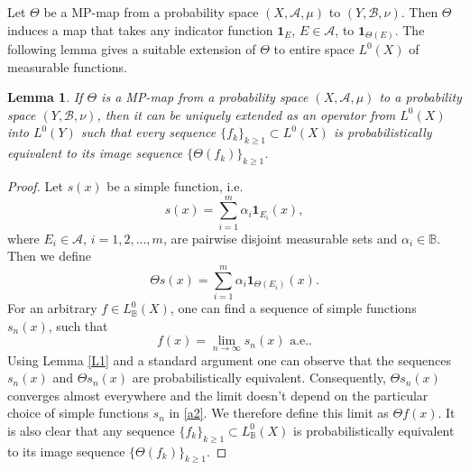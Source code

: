 \documentclass[12pt,reqno,fleqn]{amsart}
\theoremstyle{plain} %
\newtheorem{lemma}{Lemma}[section]
\theoremstyle{remark}
\def\ZB{\ensuremath{\mathscr B}}
\def\zB{\ensuremath{\mathbb B}}
\def\ZA{\ensuremath{\mathscr A}}
\def\ZI{\ensuremath{\mathbf 1}}
\theoremstyle{plain}
\numberwithin{equation}{section}
\newcommand {\e }[1]{\eqref{#1}}
\newcommand {\lem }[1]{Lemma \ref{#1}}
\begin{document}
Let $\Theta$ be a MP-map from a probability space $(X,\ZA,\mu)$ to $(Y,\ZB,\nu)$. Then $\Theta$ induces a map that takes any indicator function $\ZI_E$, $E\in \ZA$, to $\ZI_{\Theta(E)}$. The following lemma gives a suitable extension of $\Theta$ to entire space $L^0(X)$ of measurable functions. 
\begin{lemma}\label{L6}
	If  $\Theta$ is a MP-map  from a probability space $(X,\ZA,\mu)$ to a probability space $(Y,\ZB,\nu)$, then it can be uniquely extended as an operator from $L^0(X)$ into $L^0(Y)$ such that  every sequence $\{f_k\}_{k\ge1}\subset L^0(X)$ is probabilistically equivalent to its image sequence $\{\Theta(f_k)\}_{k\ge 1}$.
\end{lemma}
\begin{proof}
	Let $s(x)$ be a simple function, i.e.
	\begin{equation}
		s(x)=\sum_{i=1}^m\alpha_i\ZI_{E_i}(x),
	\end{equation}
	where $E_i\in \ZA$, $i=1,2,\ldots,m $, are pairwise disjoint measurable sets and $\alpha_i\in \zB$. Then we define 
	\begin{equation}
		\Theta s(x)=\sum_{i=1}^m\alpha_i\ZI_{\Theta(E_i)}(x).
	\end{equation}
	For an arbitrary  $f\in L^0_\zB(X)$, one can find a sequence of simple functions $s_n(x)$, such that 
	\begin{equation}\label{a2}
		f(x)=\lim_{n\to\infty}s_n(x)\text{ a.e..}
	\end{equation}
	Using \lem{L1} and a standard argument one can observe that the sequences $s_n(x)$ and $\Theta s_n(x)$ are probabilistically equivalent. Consequently, $\Theta s_n(x)$ converges almost everywhere and the limit doesn't depend on the particular choice of simple functions $s_n$ in \e{a2}. We therefore define this limit as $\Theta f(x)$. It is also clear that any sequence $\{f_k\}_{k\ge1}\subset L^0_\zB(X)$ is probabilistically equivalent to its image sequence $\{\Theta(f_k)\}_{k\ge1}$.
\end{proof}
\end{document}
